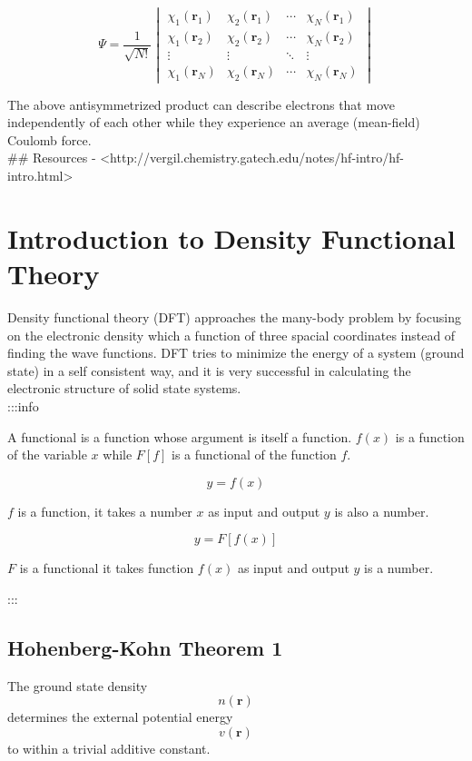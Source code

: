 \documentclass{article}
\begin{document}
$$
\Psi = \frac{1}{\sqrt{N!}}
\begin{vmatrix}
\chi_1(\textbf{r}_1) & \chi_2(\textbf{r}_1) & \cdots & \chi_N(\textbf{r}_1) \\
\chi_1(\textbf{r}_2) & \chi_2(\textbf{r}_2) & \cdots & \chi_N(\textbf{r}_2) \\
\vdots & \vdots & \ddots & \vdots \\
\chi_1(\textbf{r}_N) & \chi_2(\textbf{r}_N) & \cdots & \chi_N(\textbf{r}_N)
\end{vmatrix}
$$

The above antisymmetrized product can describe electrons that move independently
of each other while they experience an average (mean-field) Coulomb force.\\

## Resources
- <http://vergil.chemistry.gatech.edu/notes/hf-intro/hf-intro.html>


\section{Introduction to Density Functional Theory}

Density functional theory (DFT) approaches the many-body problem by focusing on
the electronic density which a function of three spacial coordinates instead of
finding the  wave functions. DFT tries to minimize the energy of a system
(ground state) in a self consistent way, and it is very successful in
calculating the electronic structure of solid state systems.\\

:::info

A functional is a function whose argument is itself a function. $f(x)$ is a
function of the variable $x$ while $F[f]$ is a functional of the function $f$.

$$
y = f(x)
$$

$f$ is a function, it takes a number $x$ as input and output $y$ is also a
number.

$$
y = F[f(x)]
$$

$F$ is a functional it takes function $f(x)$ as input and output $y$ is a
number.

:::\\

\subsection{Hohenberg-Kohn Theorem 1}
The ground state density $$n(\textbf{r})$$ determines the external potential
energy $$v(\textbf{r})$$ to within a trivial additive constant.
\end{document}
